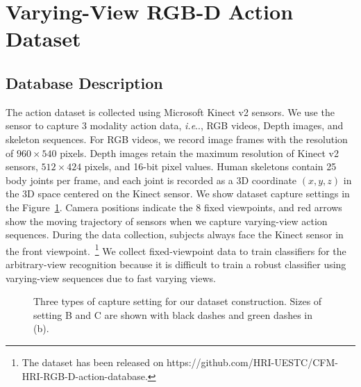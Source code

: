 \documentclass[journal]{IEEEtran}
\makeatletter
\DeclareRobustCommand\onedot{\futurelet\@let@token\@onedot}
\def\@onedot{\ifx\@let@token.\else.\null\fi\xspace}
\def\ie{\emph{i.e}\onedot} \def\Ie{\emph{I.e}\onedot}
\makeatother
\begin{document}
\section{Varying-View RGB-D Action Dataset}
\label{sec:dataset}

\subsection{Database Description}
The action dataset is collected using Microsoft Kinect v2 sensors. We use the sensor to capture 3 modality action data, \ie, RGB videos, Depth images, and skeleton sequences. For RGB videos, we record image frames with the resolution of $960\times540$ pixels. Depth images retain the maximum resolution of Kinect v2 sensors, $512\times424$ pixels, and 16-bit pixel values. Human skeletons contain 25 body joints per frame, and each joint is recorded as a 3D coordinate $(x,y,z)$ in the 3D space centered on the Kinect sensor. We show dataset capture settings in the Figure~\ref{fig:captureSet}. Camera positions indicate the 8 fixed viewpoints, and red arrows show the moving trajectory of sensors when we capture varying-view action sequences. During the data collection, subjects always face the Kinect sensor in the front viewpoint.~\footnote{The dataset has been released on  https://github.com/HRI-UESTC/CFM-HRI-RGB-D-action-database.} We collect fixed-viewpoint data to train classifiers for the arbitrary-view recognition because it is difficult to train a robust classifier using varying-view sequences due to fast varying views.

\begin{figure}
 \centering
 \hspace{0.2in}
\caption{Three types of capture setting for our dataset construction. Sizes of setting B and C are shown with black dashes and green dashes in (b).}
 \label{fig:captureSet} \end{figure}
\end{document}

